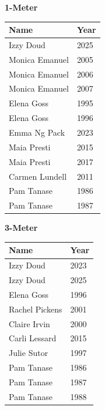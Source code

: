 \hfill
\begin{minipage}[t]{0.48\textwidth}
\centering
\textbf{\textcolor{teamprimary}{1-Meter}}\par
\vspace{0.5em}
\centering
\small
\renewcommand{\arraystretch}{1.0}
\setlength{\tabcolsep}{4pt}
\begin{tabular}{@{}p{3.0cm}p{1.0cm}@{}}
\toprule
\textbf{Name} & \textbf{Year} \\
\midrule
Izzy Doud & 2025 \\
Monica Emanuel & 2005 \\
Monica Emanuel & 2006 \\
Monica Emanuel & 2007 \\
Elena Goss & 1995 \\
Elena Goss & 1996 \\
Emma Ng Pack & 2023 \\
Maia Presti & 2015 \\
Maia Presti & 2017 \\
Carmen Lundell & 2011 \\
Pam Tanase & 1986 \\
Pam Tanase & 1987 \\
\bottomrule
\end{tabular}
\end{minipage}
\vspace{1.2em}
\noindent\begin{minipage}[t]{0.98\textwidth}
\centering
\textbf{\textcolor{teamprimary}{3-Meter}}\par
\vspace{0.5em}
\centering
\small
\renewcommand{\arraystretch}{1.0}
\setlength{\tabcolsep}{4pt}
\begin{tabular}{@{}p{3.0cm}p{1.0cm}@{}}
\toprule
\textbf{Name} & \textbf{Year} \\
\midrule
Izzy Doud & 2023 \\
Izzy Doud & 2025 \\
Elena Goss & 1996 \\
Rachel Pickens & 2001 \\
Claire Irvin & 2000 \\
Carli Lessard & 2015 \\
Julie Sutor & 1997 \\
Pam Tanase & 1986 \\
Pam Tanase & 1987 \\
Pam Tanase & 1988 \\
\bottomrule
\end{tabular}
\end{minipage}
\clearpage
